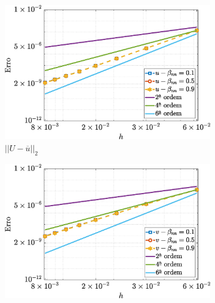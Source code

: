 \begin{figure}[H]
        \centering
	\caption{Erro para o campo de velocidades $(\overline{u},\tilde{v})$, vorticidade $(\tilde{\omega_{z}})$ e função de corrente $(\tilde{\psi})$, considerando $Re=100$ e $Wi=1$ para o escoamento de fluido viscoelástico como o modelo Oldroyd-B}
        \label{OBerror1}
	\begin{subfigure}[b]{.47\textwidth}
            \includegraphics[width=\textwidth]{figures/Case12/OldroydB/Errors/NormErr_2nd_Re_100_Wi_1_epsilon_0_xi_0_alphaG_0_Dt_1e-06_at_0.05_tipsim_1_MMS_12_U.eps}
            \caption{$||U - \overline{u}||_{2}$}
            \label{error_u_2nd_Case1_oldorydb}
        \end{subfigure}
        \vspace{0.2cm}
        \qquad
        \begin{subfigure}[b]{.47\textwidth}
            \includegraphics[width=\textwidth]{figures/Case12/OldroydB/Errors/NormErr_2nd_Re_100_Wi_1_epsilon_0_xi_0_alphaG_0_Dt_1e-06_at_0.05_tipsim_1_MMS_12_V.eps}

\end{subfigure}
\end{figure}
